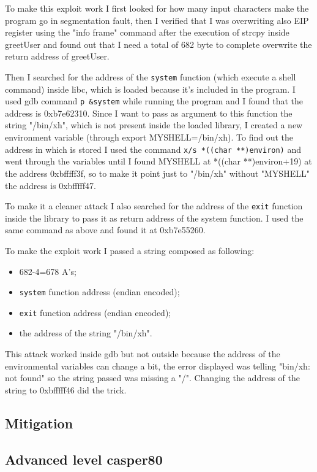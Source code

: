 \documentclass[a4paper,12pt]{article}
\begin{document}
To make this exploit work I first looked for how many input characters make the program go in segmentation fault, then I verified that I was overwriting also EIP register using the "info frame" command after the execution of strcpy inside greetUser and found out that I need a total of 682 byte to complete overwrite the return address of greetUser.

Then I searched for the address of the \texttt{system} function (which execute a shell command) inside libc, which is loaded because it's included in the program. I used gdb command \texttt{p \&system} while running the program and I found that the address is 0xb7e62310. Since I want to pass as argument to this function the string "/bin/xh", which is not present inside the loaded library, I created a new environment variable (through export MYSHELL=/bin/xh).
 To find out the address in which is stored I used the command \texttt{x/s *((char **)environ)} and went through the variables until I found MYSHELL at   *((char **)environ+19) at the address 0xbfffff3f, so to make it point just to "/bin/xh" without "MYSHELL" the address is 0xbfffff47.
 
To make it a cleaner attack I also searched for the address of the \texttt{exit} function inside the library to pass it as return address of the system function. I used the same command as above and found it at 0xb7e55260.

To make the exploit work I passed a string composed as following:
\begin{itemize}
\item 682-4=678 A's;
\item \texttt{system} function address (endian encoded);
\item \texttt{exit} function address (endian encoded);
\item the address of the string "/bin/xh".
\end{itemize}

This attack worked inside gdb but not outside because the address of the environmental variables can change a bit, the error displayed was telling "bin/xh: not found" so the string passed was missing a "/". Changing the address of the string to 0xbfffff46 did the trick.

\subsection{Mitigation}

\subsection{Advanced level casper80}
\end{document}
